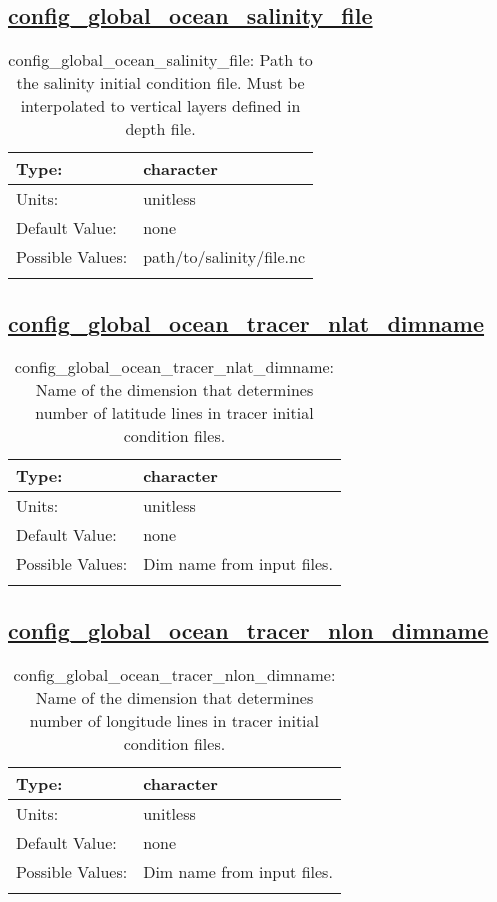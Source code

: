 \subsection[config\_global\_ocean\_salinity\_file]{\hyperref[sec:nm_tab_global_ocean]{config\_global\_ocean\_salinity\_file}}
\label{subsec:nm_sec_config_global_ocean_salinity_file}
\begin{center}
\begin{longtable}{| p{2.0in} || p{4.0in} |}
    \hline
    Type: & character \\
    \hline
    Units: & \si{unitless} \\
    \hline
    Default Value: & none \\
    \hline
    Possible Values: & path/to/salinity/file.nc \\
    \hline
    \caption{config\_global\_ocean\_salinity\_file: Path to the salinity initial condition file. Must be interpolated to vertical layers defined in depth file.}
\end{longtable}
\end{center}
\subsection[config\_global\_ocean\_tracer\_nlat\_dimname]{\hyperref[sec:nm_tab_global_ocean]{config\_global\_ocean\_tracer\_nlat\_dimname}}
\label{subsec:nm_sec_config_global_ocean_tracer_nlat_dimname}
\begin{center}
\begin{longtable}{| p{2.0in} || p{4.0in} |}
    \hline
    Type: & character \\
    \hline
    Units: & \si{unitless} \\
    \hline
    Default Value: & none \\
    \hline
    Possible Values: & Dim name from input files. \\
    \hline
    \caption{config\_global\_ocean\_tracer\_nlat\_dimname: Name of the dimension that determines number of latitude lines in tracer initial condition files.}
\end{longtable}
\end{center}
\subsection[config\_global\_ocean\_tracer\_nlon\_dimname]{\hyperref[sec:nm_tab_global_ocean]{config\_global\_ocean\_tracer\_nlon\_dimname}}
\label{subsec:nm_sec_config_global_ocean_tracer_nlon_dimname}
\begin{center}
\begin{longtable}{| p{2.0in} || p{4.0in} |}
    \hline
    Type: & character \\
    \hline
    Units: & \si{unitless} \\
    \hline
    Default Value: & none \\
    \hline
    Possible Values: & Dim name from input files. \\
    \hline
    \caption{config\_global\_ocean\_tracer\_nlon\_dimname: Name of the dimension that determines number of longitude lines in tracer initial condition files.}
\end{longtable}
\end{center}
